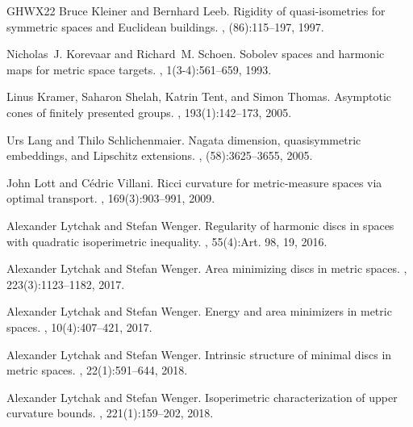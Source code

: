 \documentclass[a4paper,leqno]{amsart}
\numberwithin{equation}{section}
\theoremstyle{remark}
\theoremstyle{remark}
\begin{document}
\begin{thebibliography}{GHWX22}
Bruce Kleiner and Bernhard Leeb.
\newblock Rigidity of quasi-isometries for symmetric spaces and {E}uclidean buildings.
, (86):115--197, 1997.

Nicholas~J. Korevaar and Richard~M. Schoen.
\newblock Sobolev spaces and harmonic maps for metric space targets.
, 1(3-4):561--659, 1993.

Linus Kramer, Saharon Shelah, Katrin Tent, and Simon Thomas.
\newblock Asymptotic cones of finitely presented groups.
, 193(1):142--173, 2005.

Urs Lang and Thilo Schlichenmaier.
\newblock Nagata dimension, quasisymmetric embeddings, and {L}ipschitz extensions.
, (58):3625--3655, 2005.

John Lott and C\'edric Villani.
\newblock Ricci curvature for metric-measure spaces via optimal transport.
, 169(3):903--991, 2009.

Alexander Lytchak and Stefan Wenger.
\newblock Regularity of harmonic discs in spaces with quadratic isoperimetric inequality.
, 55(4):Art. 98, 19, 2016.

Alexander Lytchak and Stefan Wenger.
\newblock Area minimizing discs in metric spaces.
, 223(3):1123--1182, 2017.

Alexander Lytchak and Stefan Wenger.
\newblock Energy and area minimizers in metric spaces.
, 10(4):407--421, 2017.

Alexander Lytchak and Stefan Wenger.
\newblock Intrinsic structure of minimal discs in metric spaces.
, 22(1):591--644, 2018.

Alexander Lytchak and Stefan Wenger.
\newblock Isoperimetric characterization of upper curvature bounds.
, 221(1):159--202, 2018.


\end{thebibliography}
\end{document}
